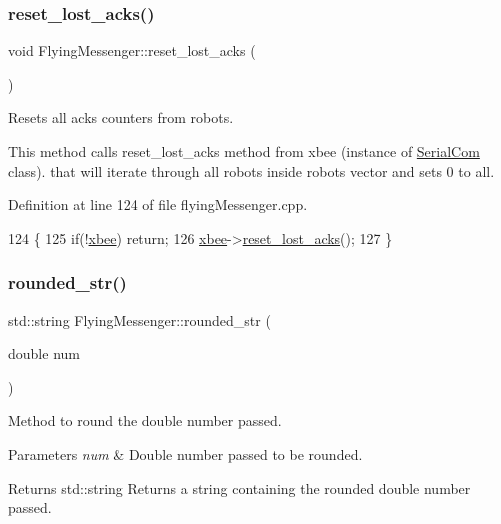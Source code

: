 \subsubsection{\texorpdfstring{reset\+\_\+lost\+\_\+acks()}{reset\_lost\_acks()}}
{\footnotesize\ttfamily void Flying\+Messenger\+::reset\+\_\+lost\+\_\+acks (\begin{DoxyParamCaption}{ }\end{DoxyParamCaption})}



Resets all acks counters from robots. 

This method calls reset\+\_\+lost\+\_\+acks method from xbee (instance of \hyperlink{class_serial_com}{Serial\+Com} class). that will iterate through all robots inside robots vector and sets 0 to all. 

Definition at line 124 of file flying\+Messenger.\+cpp.


\begin{DoxyCode}
124                                       \{
125     \textcolor{keywordflow}{if}(!\hyperlink{class_flying_messenger_a419820a45ea2bc496c10bf36b7b49033}{xbee}) \textcolor{keywordflow}{return};
126     \hyperlink{class_flying_messenger_a419820a45ea2bc496c10bf36b7b49033}{xbee}->\hyperlink{class_serial_com_af6408a34f1d7260fc40ffc0f2bc452db}{reset\_lost\_acks}();
127 \}
\end{DoxyCode}
\mbox{\label{class_flying_messenger_a687ff0844f83088397544fb7e9aab7cb}} 
\subsubsection{\texorpdfstring{rounded\+\_\+str()}{rounded\_str()}}
{\footnotesize\ttfamily std\+::string Flying\+Messenger\+::rounded\+\_\+str (\begin{DoxyParamCaption}\item[{double}]{num }\end{DoxyParamCaption})\hspace{0.3cm}{\ttfamily [private]}}



Method to round the double number passed. 


\begin{DoxyParams}{Parameters}
{\em num} & Double number passed to be rounded. \\
\hline
\end{DoxyParams}
\begin{DoxyReturn}{Returns}
std\+::string Returns a string containing the rounded double number passed. 
\end{DoxyReturn}


